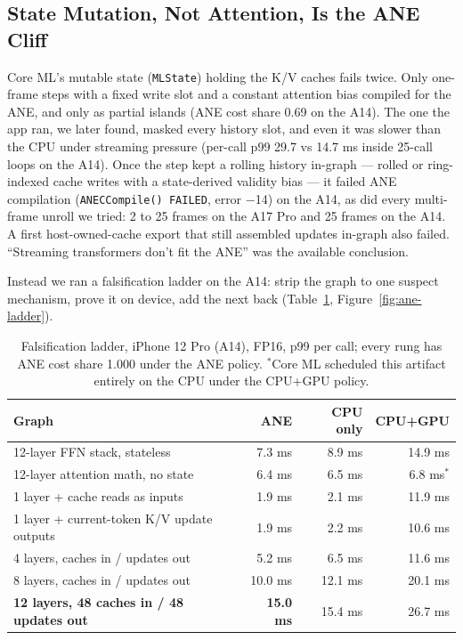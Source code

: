 \documentclass[11pt]{article}
\newcommand{\code}[1]{\texttt{#1}}
\begin{document}
\subsection{State Mutation, Not Attention, Is the ANE Cliff}\label{sec:cs2-state}

Core ML's mutable state (\code{MLState}) holding the K/V caches fails twice. Only one-frame steps with a fixed write slot and a constant attention bias compiled for the ANE, and only as partial islands (ANE cost share 0.69 on the A14). The one the app ran, we later found, masked every history slot, and even it was slower than the CPU under streaming pressure (per-call p99 29.7 vs 14.7 ms inside 25-call loops on the A14). Once the step kept a rolling history in-graph --- rolled or ring-indexed cache writes with a state-derived validity bias --- it failed ANE compilation (\code{ANECCompile() FAILED}, error $-$14) on the A14, as did every multi-frame unroll we tried: 2 to 25 frames on the A17 Pro and 25 frames on the A14. A first host-owned-cache export that still assembled updates in-graph also failed. ``Streaming transformers don't fit the ANE'' was the available conclusion.

Instead we ran a falsification ladder on the A14: strip the graph to one suspect mechanism, prove it on device, add the next back (Table~\ref{tab:cs2-ladder}, Figure~\ref{fig:ane-ladder}).

\begin{table}[h]
\centering
\small
\caption{Falsification ladder, iPhone 12 Pro (A14), FP16, p99 per call; every rung has ANE cost share 1.000 under the ANE policy. $^*$Core ML scheduled this artifact entirely on the CPU under the CPU+GPU policy.}
\label{tab:cs2-ladder}
\begin{tabular}{@{}p{6.4cm}rrr@{}}
\toprule
Graph & ANE & CPU only & CPU+GPU \\
\midrule
12-layer FFN stack, stateless & 7.3 ms & 8.9 ms & 14.9 ms \\
12-layer attention math, no state & 6.4 ms & 6.5 ms & 6.8 ms$^*$ \\
1 layer + cache reads as inputs & 1.9 ms & 2.1 ms & 11.9 ms \\
1 layer + current-token K/V update outputs & 1.9 ms & 2.2 ms & 10.6 ms \\
4 layers, caches in / updates out & 5.2 ms & 6.5 ms & 11.6 ms \\
8 layers, caches in / updates out & 10.0 ms & 12.1 ms & 20.1 ms \\
\textbf{12 layers, 48 caches in / 48 updates out} & \textbf{15.0 ms} & 15.4 ms & 26.7 ms \\
\bottomrule
\end{tabular}
\end{table}
\end{document}
